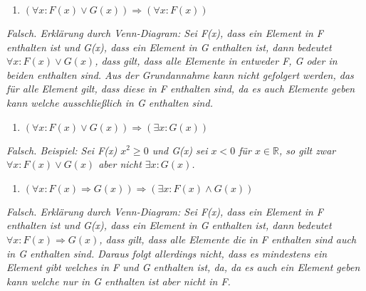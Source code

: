 \begin{enumerate}[label={c)}, leftmargin=*]
\item $(\forall x : F(x) \lor G(x)) \Rightarrow (\forall x : F(x))$
\end{enumerate}

\textit{Falsch. Erklärung durch Venn-Diagram: Sei F(x), dass ein Element in F enthalten ist und G(x), dass ein Element in G enthalten ist, dann bedeutet $\forall x : F(x) \lor G(x)$, dass gilt, dass alle Elemente in entweder F, G oder in beiden enthalten sind. Aus der Grundannahme kann nicht gefolgert werden, das für alle Element gilt, dass diese in F enthalten sind, da es auch Elemente geben kann welche ausschließlich in G enthalten sind.}

\begin{center}
\end{center}

\begin{enumerate}[label={d)}, leftmargin=*]
\item $(\forall x : F(x) \lor G(x)) \Rightarrow (\exists x : G(x))$
\end{enumerate}

\textit{Falsch. Beispiel: Sei F(x) $x^2 \geq 0$ und G(x) sei $x < 0$ für $x \in \mathbb{R}$, so gilt zwar $\forall x : F(x) \lor G(x)$ aber nicht $\exists x : G(x)$.}

\newpage

\begin{enumerate}[label={e)}, leftmargin=*]
\item $(\forall x : F(x) \Rightarrow G(x)) \Rightarrow (\exists x : F(x) \land G(x))$
\end{enumerate}

\textit{Falsch. Erklärung durch Venn-Diagram: Sei F(x), dass ein Element in F enthalten ist und G(x), dass ein Element in G enthalten ist, dann bedeutet $\forall x : F(x) \Rightarrow G(x)$, dass gilt, dass alle Elemente die in F enthalten sind auch in G enthalten sind. Daraus folgt allerdings nicht, dass es mindestens ein Element gibt welches in F und G enthalten ist, da, da es auch ein Element geben kann welche nur in G enthalten ist aber nicht in F.}

